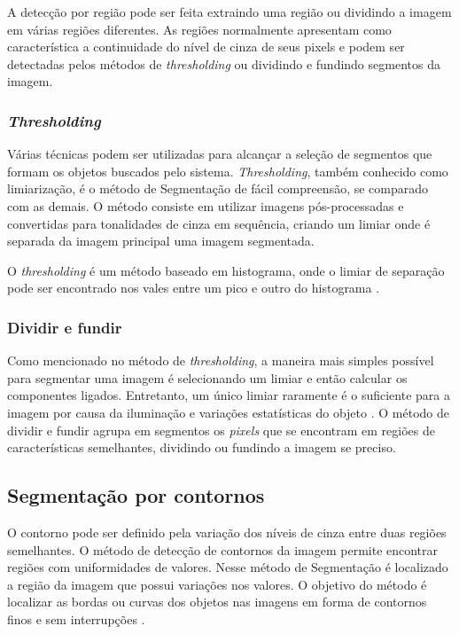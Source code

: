 A detecção por região pode ser feita extraindo uma região ou dividindo a imagem em várias regiões diferentes. As regiões normalmente apresentam como característica a continuidade do nível de cinza de seus pixels e podem ser detectadas pelos métodos de \textit{thresholding} ou dividindo e fundindo segmentos da imagem.

\subsubsection{\textit{Thresholding}}

Várias técnicas podem ser utilizadas para alcançar a seleção de segmentos que formam os objetos buscados pelo sistema. \textit{Thresholding}, também conhecido como limiarização, é o método de Segmentação de fácil compreensão, se comparado com as demais. O método consiste em utilizar imagens pós-processadas e convertidas para tonalidades de cinza em sequência, criando um limiar onde é separada da imagem principal uma imagem segmentada.

O \textit{thresholding} é um método baseado em histograma, onde o limiar de separação pode ser encontrado nos vales entre um pico e outro do histograma \cite{PADILHA}.

\subsubsection{Dividir e fundir}

Como mencionado no método de \textit{thresholding}, a maneira mais simples possível para segmentar uma imagem é selecionando um limiar e então calcular os componentes ligados. Entretanto, um único limiar raramente é o suficiente para a imagem por causa da iluminação e variações estatísticas do objeto \cite{SZELISKI}. O método de dividir e fundir agrupa em segmentos os \textit{pixels} que se encontram em regiões de características semelhantes, dividindo ou fundindo a imagem se preciso.

\subsection{Segmentação por contornos}

O contorno pode ser definido pela variação dos níveis de cinza entre duas regiões semelhantes. O método de detecção de contornos da imagem permite encontrar regiões com uniformidades de valores. Nesse método de Segmentação é localizado a região da imagem que possui variações nos valores. O objetivo do método é localizar as bordas ou curvas dos objetos nas imagens em forma de contornos finos e sem interrupções \cite{SZELISKI}.

